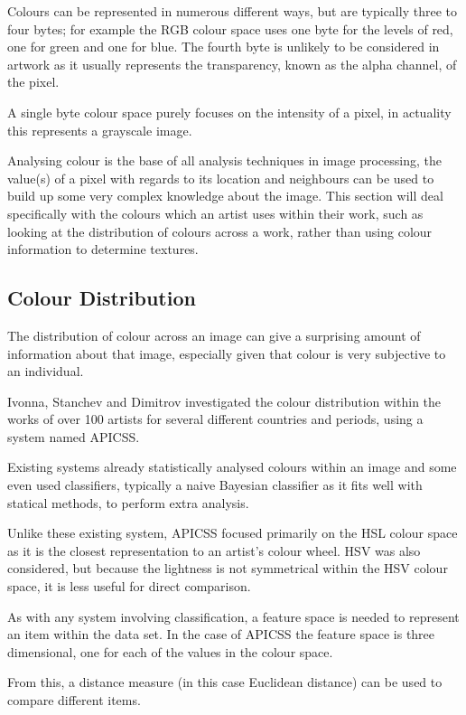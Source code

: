 \documentclass[conference]{IEEEtran}
\begin{document}
Colours can be represented in numerous different ways, but are typically three
to four bytes; for example the \gls{RGB} colour space uses one byte for the
levels of red, one for green and one for blue. The fourth byte is unlikely to
be considered in artwork as it usually represents the transparency, known as
the alpha channel, of the pixel.

A single byte colour space purely focuses on the intensity of a pixel, in
actuality this represents a grayscale image.

Analysing colour is the base of all analysis techniques in image processing,
the value(s) of a pixel with regards to its location and neighbours can be used
to build up some very complex knowledge about the image. This section will deal
specifically with the colours which an artist uses within their work, such as
looking at the distribution of colours across a work, rather than using colour
information to determine textures.

\subsection{Colour Distribution}

The distribution of colour across an image can give a surprising amount of
information about that image, especially given that colour is very subjective
to an individual.

Ivonna, Stanchev and Dimitrov investigated the colour
distribution within the works of over 100 artists for several different
countries and periods, using a system named \gls{APICSS}\cite{ivanova2008analysis}.

Existing systems already statistically analysed colours within an image and
some even used classifiers, typically a naive Bayesian classifier as it fits
well with statical methods, to perform extra analysis.

Unlike these existing system, \gls{APICSS} focused primarily on the \gls{HSL}
colour space as it is the closest representation to an artist's colour wheel.
\gls{HSV} was also considered, but because the lightness is not symmetrical
within the \gls{HSV} colour space, it is less useful for direct comparison.

As with any system involving classification, a feature space is needed to
represent an item within the data set. In the case of \gls{APICSS} the feature
space is three dimensional, one for each of the values in the colour space.

From this, a distance measure (in this case Euclidean distance) can be used to
compare different items.
\end{document}
